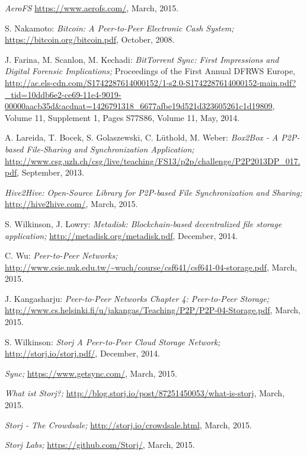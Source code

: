 \begin{thebibliography}{99}
		\emph{AeroFS}
		\url{https://www.aerofs.com/},
		March, 2015.

		S. Nakamoto:
		\emph{Bitcoin: A Peer-to-Peer Electronic Cash System;}
		\url{https://bitcoin.org/bitcoin.pdf},
		October, 2008.

		J. Farina, M. Scanlon, M. Kechadi:
		\emph{BitTorrent Sync: First Impressions and Digital Forensic Implications;}
		Proceedings of the First Annual DFRWS Europe,
		\url{http://ac.els-cdn.com/S1742287614000152/1-s2.0-S1742287614000152-main.pdf?_tid=10ddb6e2-ce69-11e4-9019-00000aacb35d&acdnat=1426791318_6677afbe19d521d323605261c1d19809},
		Volume 11, Supplement 1, Pages S77\textendash S86, Volume 11, May, 2014.

		A. Lareida, T. Bocek, S. Golaszewski, C. L\"uthold, M. Weber:
		\emph{Box2Box - A P2P-based File-Sharing and Synchronization Application;}
		\url{http://www.csg.uzh.ch/csg/live/teaching/FS13/p2p/challenge/P2P2013DP_017.pdf},
		September, 2013.

		\emph{Hive2Hive: Open-Source Library for P2P-based File Synchronization and Sharing;}
		\url{http://hive2hive.com/},
		March, 2015.

		S. Wilkinson, J. Lowry:
		\emph{Metadisk: Blockchain-based decentralized file storage application;}
		\url{http://metadisk.org/metadisk.pdf},
		December, 2014.

		C. Wu:
		\emph{Peer-to-Peer Networks;}
		\url{http://www.csie.nuk.edu.tw/~wuch/course/csf641/csf641-04-storage.pdf},
		March, 2015.

		J. Kangasharju:
		\emph{Peer-to-Peer Networks Chapter 4: Peer-to-Peer Storage;}
		\url{http://www.cs.helsinki.fi/u/jakangas/Teaching/P2P/P2P-04-Storage.pdf},
		March, 2015.

		S. Wilkinson:
		\emph{Storj A Peer-to-Peer Cloud Storage Network;}
		\url{http://storj.io/storj.pdf/},
		December, 2014.

		\emph{Sync;}
		\url{https://www.getsync.com/},
		March, 2015.
		
		\emph{What ist Storj?;}
		\url{http://blog.storj.io/post/87251450053/what-is-storj},
		March, 2015.
		
		\emph{Storj - The Crowdsale;}
		\url{http://storj.io/crowdsale.html},
		March, 2015.

		\emph{Storj Labs;}
		\url{https://github.com/Storj/},
		March, 2015.
\end{thebibliography}